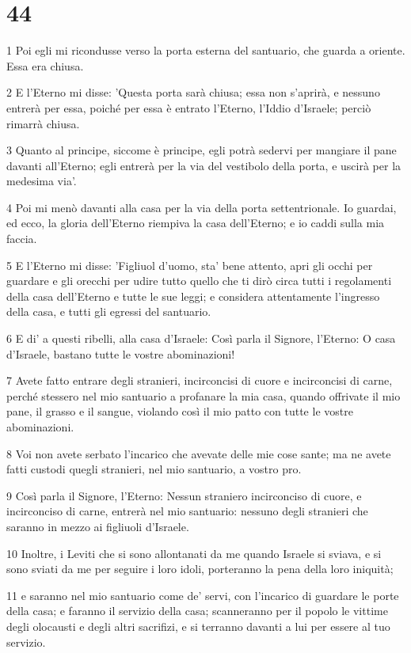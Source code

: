 \chapter{44}

\par 1 Poi egli mi ricondusse verso la porta esterna del santuario, che guarda a oriente. Essa era chiusa.
\par 2 E l'Eterno mi disse: 'Questa porta sarà chiusa; essa non s'aprirà, e nessuno entrerà per essa, poiché per essa è entrato l'Eterno, l'Iddio d'Israele; perciò rimarrà chiusa.
\par 3 Quanto al principe, siccome è principe, egli potrà sedervi per mangiare il pane davanti all'Eterno; egli entrerà per la via del vestibolo della porta, e uscirà per la medesima via'.
\par 4 Poi mi menò davanti alla casa per la via della porta settentrionale. Io guardai, ed ecco, la gloria dell'Eterno riempiva la casa dell'Eterno; e io caddi sulla mia faccia.
\par 5 E l'Eterno mi disse: 'Figliuol d'uomo, sta' bene attento, apri gli occhi per guardare e gli orecchi per udire tutto quello che ti dirò circa tutti i regolamenti della casa dell'Eterno e tutte le sue leggi; e considera attentamente l'ingresso della casa, e tutti gli egressi del santuario.
\par 6 E di' a questi ribelli, alla casa d'Israele: Così parla il Signore, l'Eterno: O casa d'Israele, bastano tutte le vostre abominazioni!
\par 7 Avete fatto entrare degli stranieri, incirconcisi di cuore e incirconcisi di carne, perché stessero nel mio santuario a profanare la mia casa, quando offrivate il mio pane, il grasso e il sangue, violando così il mio patto con tutte le vostre abominazioni.
\par 8 Voi non avete serbato l'incarico che avevate delle mie cose sante; ma ne avete fatti custodi quegli stranieri, nel mio santuario, a vostro pro.
\par 9 Così parla il Signore, l'Eterno: Nessun straniero incirconciso di cuore, e incirconciso di carne, entrerà nel mio santuario: nessuno degli stranieri che saranno in mezzo ai figliuoli d'Israele.
\par 10 Inoltre, i Leviti che si sono allontanati da me quando Israele si sviava, e si sono sviati da me per seguire i loro idoli, porteranno la pena della loro iniquità;
\par 11 e saranno nel mio santuario come de' servi, con l'incarico di guardare le porte della casa; e faranno il servizio della casa; scanneranno per il popolo le vittime degli olocausti e degli altri sacrifizi, e si terranno davanti a lui per essere al tuo servizio.

